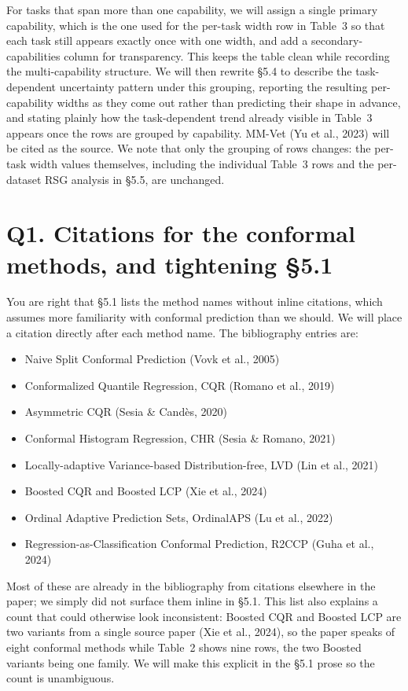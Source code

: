 \documentclass[11pt]{article}
\begin{document}
For tasks that span more than one capability, we will assign a single primary capability, which is the one used for the per-task width row in Table~3 so that each task still appears exactly once with one width, and add a secondary-capabilities column for transparency. This keeps the table clean while recording the multi-capability structure. We will then rewrite \S 5.4 to describe the task-dependent uncertainty pattern under this grouping, reporting the resulting per-capability widths as they come out rather than predicting their shape in advance, and stating plainly how the task-dependent trend already visible in Table~3 appears once the rows are grouped by capability. MM-Vet (Yu et al., 2023) will be cited as the source. We note that only the grouping of rows changes: the per-task width values themselves, including the individual Table~3 rows and the per-dataset RSG analysis in \S 5.5, are unchanged.

\section*{Q1. Citations for the conformal methods, and tightening \S 5.1}

You are right that \S 5.1 lists the method names without inline citations, which assumes more familiarity with conformal prediction than we should. We will place a citation directly after each method name. The bibliography entries are:

\begin{itemize}[leftmargin=*]
\item Naive Split Conformal Prediction (Vovk et al., 2005)
\item Conformalized Quantile Regression, CQR (Romano et al., 2019)
\item Asymmetric CQR (Sesia \& Cand\`{e}s, 2020)
\item Conformal Histogram Regression, CHR (Sesia \& Romano, 2021)
\item Locally-adaptive Variance-based Distribution-free, LVD (Lin et al., 2021)
\item Boosted CQR and Boosted LCP (Xie et al., 2024)
\item Ordinal Adaptive Prediction Sets, OrdinalAPS (Lu et al., 2022)
\item Regression-as-Classification Conformal Prediction, R2CCP (Guha et al., 2024)
\end{itemize}

Most of these are already in the bibliography from citations elsewhere in the paper; we simply did not surface them inline in \S 5.1. This list also explains a count that could otherwise look inconsistent: Boosted CQR and Boosted LCP are two variants from a single source paper (Xie et al., 2024), so the paper speaks of eight conformal methods while Table~2 shows nine rows, the two Boosted variants being one family. We will make this explicit in the \S 5.1 prose so the count is unambiguous.
\end{document}
